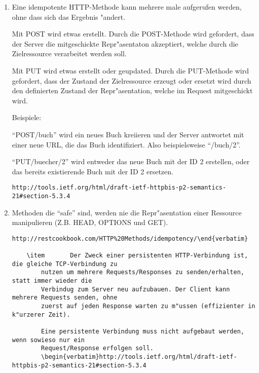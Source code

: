 \documentclass[11pt, oneside, BCOR0mm, DIV9, headinclude]{scrartcl}
\begin{document}
\begin{enumerate}
    \item 	Eine idempotente HTTP-Methode kann mehrere male aufgerufen werden, ohne dass sich
		das Ergebnis "andert.

		Mit POST wird etwas erstellt.
		Durch die POST-Methode wird gefordert, dass der Server die mitgeschickte Repr"asentaton 
		akzeptiert, welche durch die Zielressource verarbeitet werden soll.

		Mit PUT wird etwas erstellt oder geupdated.
		Durch die PUT-Methode wird gefordert, dass der Zustand der Zielressource erzeugt oder 
		ersetzt wird durch den definierten Zustand der Repr"asentation, welche im Request 
		mitgeschickt wird.


		Beispiele:

		``POST/buch'' wird ein neues Buch kreiieren und
		der Server antwortet mit einer neue URL, die das Buch identifiziert.
		Also beispielsweise ``/buch/2''.

		``PUT/buecher/2'' wird entweder das neue Buch mit der ID 2 erstellen, oder das 
		bereits existierende Buch mit der ID 2 ersetzen.
		\begin{verbatim}http://tools.ietf.org/html/draft-ietf-httpbis-p2-semantics-21#section-5.3.4 \end{verbatim}


    \item       Methoden die ``safe'' sind, werden nie die Repr"asentation einer Ressource
	        manipulieren (Z.B. HEAD, OPTIONS und GET).
		\begin{verbatim}http://restcookbook.com/HTTP%20Methods/idempotency/\end{verbatim}

    \item       Der Zweck einer persistenten HTTP-Verbindung ist, die gleiche TCP-Verbindung zu
		nutzen um mehrere Requests/Responses zu senden/erhalten, statt immer wieder die 
		Verbindug zum Server neu aufzubauen. Der Client kann mehrere Requests senden, ohne 
		zuerst auf jeden Response warten zu m"ussen (effizienter in k"urzerer Zeit).
		
		Eine persistente Verbindung muss nicht aufgebaut werden, wenn sowieso nur ein
		Request/Response erfolgen soll.
		\begin{verbatim}http://tools.ietf.org/html/draft-ietf-httpbis-p2-semantics-21#section-5.3.4 \end{verbatim}

\end{enumerate}
\end{document}
